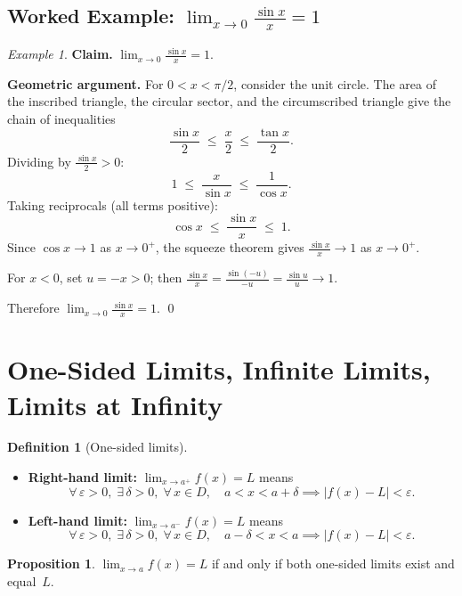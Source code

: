 \documentclass[12pt,a4paper,openany]{book}
\theoremstyle{definition}
\newtheorem{definition}{Definition}[chapter]
\newtheorem{proposition}{Proposition}[chapter]
\theoremstyle{remark}
\newtheorem{example}{Example}[chapter]
\begin{document}
\subsection{Worked Example: \texorpdfstring{$\lim_{x\to 0}\frac{\sin x}{x}=1$}{lim sin(x)/x = 1}}

\begin{example}\label{ex:sinx-over-x}
\textbf{Claim.}\; $\displaystyle\lim_{x\to 0}\frac{\sin x}{x}=1$.

\medskip\noindent
\textbf{Geometric argument.}\;
For $0<x<\pi/2$, consider the unit circle.  The area of the inscribed
triangle, the circular sector, and the circumscribed triangle give the
chain of inequalities
\[
  \frac{\sin x}{2}
  \;\le\; \frac{x}{2}
  \;\le\; \frac{\tan x}{2}.
\]
Dividing by $\frac{\sin x}{2}>0$:
\[
  1 \;\le\; \frac{x}{\sin x} \;\le\; \frac{1}{\cos x}.
\]
Taking reciprocals (all terms positive):
\[
  \cos x \;\le\; \frac{\sin x}{x} \;\le\; 1.
\]
Since $\cos x\to 1$ as $x\to 0^+$, the squeeze theorem gives
$\frac{\sin x}{x}\to 1$ as $x\to 0^+$.

For $x<0$, set $u=-x>0$; then $\frac{\sin x}{x}
=\frac{\sin(-u)}{-u}=\frac{\sin u}{u}\to 1$.

Therefore $\displaystyle\lim_{x\to 0}\frac{\sin x}{x}=1$.  \qed
\end{example}

\section{One-Sided Limits, Infinite Limits, Limits at Infinity}

\begin{definition}[One-sided limits]\label{def:one-sided}
\leavevmode
\begin{itemize}
\item \textbf{Right-hand limit:}
$\displaystyle\lim_{x\to a^+}f(x)=L$ means
\[
  \forall\,\varepsilon>0,\;\exists\,\delta>0,\;
  \forall\, x\in D,\quad
  a<x<a+\delta \implies |f(x)-L|<\varepsilon.
\]
\item \textbf{Left-hand limit:}
$\displaystyle\lim_{x\to a^-}f(x)=L$ means
\[
  \forall\,\varepsilon>0,\;\exists\,\delta>0,\;
  \forall\, x\in D,\quad
  a-\delta<x<a \implies |f(x)-L|<\varepsilon.
\]
\end{itemize}
\end{definition}

\begin{proposition}\label{prop:two-sided-from-one-sided}
$\displaystyle\lim_{x\to a}f(x)=L$ if and only if both one-sided
limits exist and equal~$L$.
\end{proposition}
\end{document}
